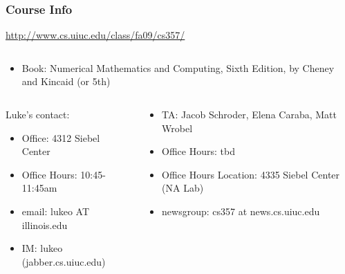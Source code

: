 \documentclass[10pt]{beamer}
\begin{document}
\begin{frame}
\frametitle{Course Info}
\begin{block}{}
\url{http://www.cs.uiuc.edu/class/fa09/cs357/}
\end{block}
\begin{columns}
\begin{column}{0.55\textwidth}
\begin{itemize}
\item Book: Numerical Mathematics and Computing, Sixth Edition, by
Cheney and Kincaid (or 5th)
\end{itemize}
\end{column}
\begin{column}{0.35\textwidth}
\end{column}
\end{columns}

\bigskip
{\small
\begin{columns}
\begin{column}{0.32\textwidth}
Luke's contact:
\begin{itemize}
\item Office: 4312 Siebel Center
\item Office Hours: 10:45-11:45am
\item email: lukeo AT illinois.edu
\item IM: lukeo (jabber.cs.uiuc.edu) %
\end{itemize}
\end{column}
\begin{column}{0.32\textwidth}
\begin{itemize}
\item TA: Jacob Schroder, Elena Caraba, Matt Wrobel
\item Office Hours: tbd
\item Office Hours Location: 4335 Siebel Center (NA Lab)
\item newsgroup: cs357 at news.cs.uiuc.edu
\end{itemize}
\end{column}
\end{columns}
}
\end{frame}
\end{document}
